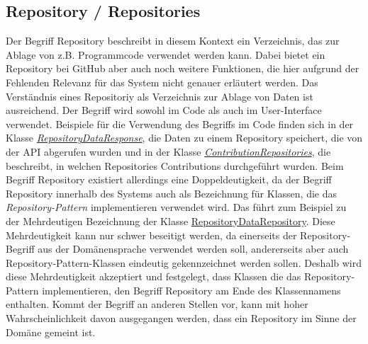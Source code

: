 \subsection*{Repository / Repositories}
Der Begriff Repository beschreibt in diesem Kontext ein Verzeichnis, das zur Ablage von z.B. Programmcode verwendet werden kann.
Dabei bietet ein Repository bei GitHub aber auch noch weitere Funktionen, die hier aufgrund der Fehlenden Relevanz für das System nicht genauer erläutert werden.
Das Verständnis eines Repositoriy als Verzeichnis zur Ablage von Daten ist ausreichend.
Der Begriff wird sowohl im Code als auch im User-Interface verwendet.
Beispiele für die Verwendung des Begriffs im Code finden sich in der Klasse \href{https://github.com/lukaspanni/OpenSourceStats/blob/main/app/src/main/java/de/lukaspanni/opensourcestats/data/RepositoryDataResponse.java}{\textit{RepositoryDataResponse}}, die Daten zu einem Repository speichert, die von der API abgerufen wurden und in der Klasse \href{https://github.com/lukaspanni/OpenSourceStats/blob/main/app/src/main/java/de/lukaspanni/opensourcestats/data/ContributionRepositories.java}{\textit{ContributionRepositories}}, die beschreibt, in welchen Repositories Contributions durchgeführt wurden.
\newline
Beim Begriff Repository existiert allerdings eine Doppeldeutigkeit, da der Begriff Repository innerhalb des Systems auch als Bezeichnung für Klassen, die das \textit{Repository-Pattern} implementieren verwendet wird. Das führt zum Beispiel zu der Mehrdeutigen Bezeichnung der Klasse \href{https://github.com/lukaspanni/OpenSourceStats/blob/main/app/src/main/java/de/lukaspanni/opensourcestats/repository/RepositoryDataRepository.java}{RepositoryDataRepository}. Diese Mehrdeutigkeit kann nur schwer beseitigt werden, da einerseits der Repository-Begriff aus der Domänensprache verwendet werden soll, andererseits aber auch Repository-Pattern-Klassen eindeutig gekennzeichnet werden sollen. Deshalb wird diese Mehrdeutigkeit akzeptiert und festgelegt, dass Klassen die das Repository-Pattern implementieren, den Begriff Repository am Ende des Klassennamens enthalten. Kommt der Begriff an anderen Stellen vor, kann mit hoher Wahrscheinlichkeit davon ausgegangen werden, dass ein Repository im Sinne der Domäne gemeint ist.

